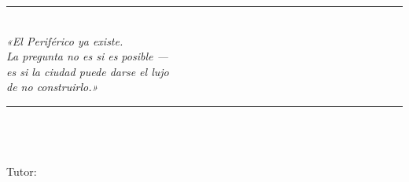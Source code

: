 %
%
\begin{frame}[plain]
  \vfill
  \begin{center}
    {\color{ColorAcento}\rule{0.65\textwidth}{1.2pt}}\\[0.42cm]
    {\large\itshape\color{ColorPrincipal}
      «El Periférico ya existe.\\[0.10cm]
      La pregunta no es si es posible —\\[0.06cm]
      es si la ciudad puede darse el lujo\\
      de no construirlo.»}\\[0.42cm]
    {\color{ColorAcento}\rule{0.65\textwidth}{1.2pt}}\\[0.36cm]
    {\normalsize\bfseries\color{ColorPrincipal} \Autor}\\[0.10cm]
    {\small\color{gray!65} \ProgramaCorto}\\[0.05cm]
    {\small\color{gray!65} Tutor: \ProfesorAsignado}\\[0.05cm]
    {\small\color{gray!65} \FechaPresent}
  \end{center}
  \vfill
\end{frame}
